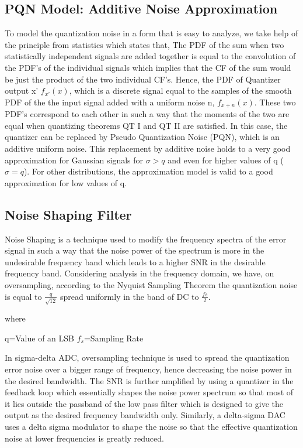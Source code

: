 \documentclass[colorlinks=true,pdfstartview=FitV,linkcolor=blue,
            citecolor=red,urlcolor=magenta]{ligodoc}
\begin{document}
\subsection{PQN Model: Additive Noise Approximation} To model the quantization noise in a form that is easy to analyze, we take help of the principle from statistics which states that, The PDF of the sum when two statistically independent signals are added together is equal to the convolution of the PDF's of the individual signals which implies that the CF of the sum would be just the product of the two individual CF's.
Hence, the PDF of Quantizer output x' $f_{x'}(x)$, which is a discrete signal equal to the samples of the smooth PDF of the the input signal added with a uniform noise n, $f_{x+n}(x)$. These two PDF's correspond to each other in such a way that the moments of the two are equal when quantizing theorems QT I and QT II are satisfied.   In this case, the quantizer can be replaced by Pseudo Quantization Noise (PQN), which is an additive uniform noise. This replacement by additive noise holds to a  very good approximation for Gaussian signals for $\sigma > q$ and even for higher values of q ($\sigma = q$). For other distributions, the approximation model is valid to a good approximation for low values of q.
\subsection{Noise Shaping Filter}
Noise Shaping is a technique used to modify the frequency spectra of the error signal in such a way that the noise power of the spectrum is more in the undesirable frequency band which leads to a higher SNR in the desirable frequency band. 
Considering analysis in the frequency domain, we have, on oversampling, according to the Nyquist Sampling Theorem the quantization noise is equal to $\frac{q}{\sqrt{12}}$ spread uniformly in the band of DC to $\frac{fs}{2}$.\cite{Interpolation}

where 

q=Value of an LSB
$f_{s}$=Sampling Rate

In sigma-delta ADC, oversampling technique is used to spread the quantization error noise over a bigger range of frequency, hence decreasing the noise power in the desired bandwidth. The SNR is further amplified by using a quantizer in the feedback loop which essentially shapes the noise power spectrum so that most of it lies outside the passband of the low pass filter which is designed to give the output as the desired frequency bandwidth only. \cite{SNR}
Similarly, a delta-sigma DAC \cite{Interpolation} uses a delta sigma modulator to shape the noise so that the effective quantization noise at lower frequencies is greatly reduced.
\end{document}
